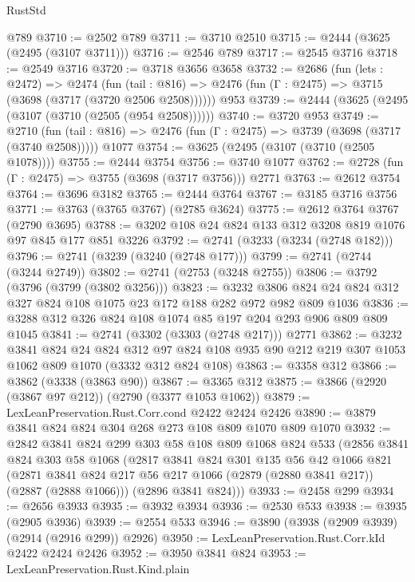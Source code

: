 \begin{lexlean}{RustStd}
\begin{coremodule}
    @789
@3710 := @2502 @789
@3711 := @3710 @2510
@3715 := @2444 (@3625 (@2495 (@3107 @3711)))
@3716 := @2546 @789
@3717 := @2545 @3716
@3718 := @2549 @3716
@3720 := @3718 @3656 @3658
@3732 := @2686
    (fun (lets : @2472) =>
    @2474
      (fun (tail : @816) => @2476 (fun (Γ : @2475) => @3715 (@3698 (@3717 (@3720 @2506 @2508))))))
    @953
@3739 := @2444 (@3625 (@2495 (@3107 (@3710 (@2505 (@954 @2508))))))
@3740 := @3720 @953
@3749 := @2710
    (fun (tail : @816) => @2476 (fun (Γ : @2475) => @3739 (@3698 (@3717 (@3740 @2508)))))
    @1077
@3754 := @3625 (@2495 (@3107 (@3710 (@2505 @1078))))
@3755 := @2444 @3754
@3756 := @3740 @1077
@3762 := @2728 (fun (Γ : @2475) => @3755 (@3698 (@3717 @3756))) @2771
@3763 := @2612 @3754
@3764 := @3696 @3182
@3765 := @2444 @3764
@3767 := @3185 @3716 @3756
@3771 := @3763 (@3765 @3767) (@2785 @3624)
@3775 := @2612 @3764 @3767 (@2790 @3695)
@3788 := @3202 @108 @24 @824 @133 @312 @3208 @819 @1076 @97 @845 @177 @851 @3226
@3792 := @2741 (@3233 (@3234 (@2748 @182)))
@3796 := @2741 (@3239 (@3240 (@2748 @177)))
@3799 := @2741 (@2744 (@3244 @2749))
@3802 := @2741 (@2753 (@3248 @2755))
@3806 := @3792 (@3796 (@3799 (@3802 @3256)))
@3823 := @3232 @3806 @824 @24 @824 @312 @327 @824 @108 @1075 @23 @172 @188 @282 @972 @982 @809 @1036
@3836 := @3288 @312 @326 @824 @108 @1074 @85 @197 @204 @293 @906 @809 @809 @1045
@3841 := @2741 (@3302 (@3303 (@2748 @217))) @2771
@3862 := @3232
    @3841
    @824
    @24
    @824
    @312
    @97
    @824
    @108
    @935
    @90
    @212
    @219
    @307
    @1053
    @1062
    @809
    @1070
    (@3332 @312 @824 @108)
@3863 := @3358 @312
@3866 := @3862 (@3338 (@3863 @90))
@3867 := @3365 @312
@3875 := @3866 (@2920 (@3867 @97 @212)) (@2790 (@3377 @1053 @1062))
@3879 := LexLeanPreservation.Rust.Corr.cond @2422 @2424 @2426
@3890 := @3879 @3841 @824 @824 @304 @268 @273 @108 @809 @1070 @809 @1070
@3932 := @2842
    @3841
    @824
    @299
    @303
    @58
    @108
    @809
    @1068
    @824
    @533
    (@2856
      @3841
      @824
      @303
      @58
      @1068
      (@2817
        @3841
        @824
        @301
        @135
        @56
        @42
        @1066
        @821
        (@2871 @3841 @824 @217 @56 @217 @1066 (@2879 (@2880 @3841 @217)) (@2887 (@2888 @1066)))
        (@2896 @3841 @824)))
@3933 := @2458 @299
@3934 := @2656 @3933
@3935 := @3932 @3934
@3936 := @2530 @533
@3938 := @3935 (@2905 @3936)
@3939 := @2554 @533
@3946 := @3890 (@3938 (@2909 @3939) (@2914 (@2916 @299)) @2926)
@3950 := LexLeanPreservation.Rust.Corr.kId @2422 @2424 @2426
@3952 := @3950 @3841 @824
@3953 := LexLeanPreservation.Rust.Kind.plain

\end{coremodule}
\end{lexlean}
